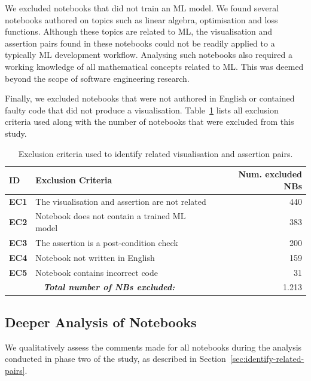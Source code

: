 \documentclass[conference]{IEEEtran}
\begin{document}
We excluded notebooks that did not train an ML model. We found several
notebooks authored on topics such as linear algebra, optimisation and
loss functions. Although these topics are related to ML, the
visualisation and assertion pairs found in these notebooks could not
be readily applied to a typically ML development workflow. Analysing
such notebooks also required a working knowledge of all mathematical
concepts related to ML. This was deemed beyond the scope of software
engineering research.

Finally, we excluded notebooks that were not authored in English or
contained faulty code that did not produce
a visualisation. Table~\ref{tab:exclusion-criteria} lists all
exclusion criteria used along with the number of notebooks that were
excluded from this study.

\begin{table}
  \centering
  \caption{Exclusion criteria used to identify related visualisation and assertion pairs.}
  \begin{tabular}{l p{} r}
    \hline
    \textbf{ID} &
    \textbf{Exclusion Criteria} &
    \textbf{Num. excluded NBs}\\
    \hline
    \textbf{EC1} &
    The visualisation and assertion are not related &
    440\\
    \textbf{EC2} &
    Notebook does not contain a trained ML model &
    383\\
    \textbf{EC3} &
    The assertion is a post-condition check &
    200\\
    \textbf{EC4} &
    Notebook not written in English &
    159\\
    \textbf{EC5} &
    Notebook contains incorrect code &
    31\\
    \hline
    \multicolumn{2}{c}{\emph{\textbf{Total number of NBs excluded:}}} &
    1.213\\
    \hline
  \end{tabular}
  \label{tab:exclusion-criteria}
\end{table}

\subsection{Deeper Analysis of Notebooks}\label{sec:deep-dive}

We qualitatively assess the comments made for all notebooks during the
analysis conducted in phase two of the study, as described in
Section~\ref{sec:identify-related-pairs}. 
\end{document}
